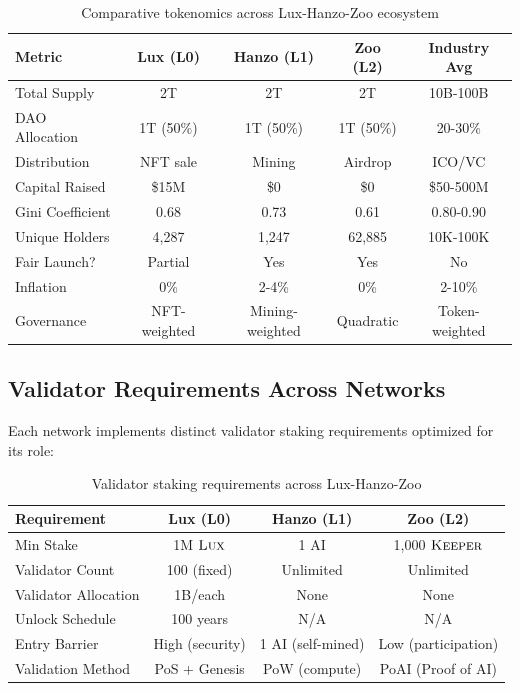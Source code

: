 \begin{table}[h]
\centering
\small
\begin{tabular}{lcccc}
\toprule
\textbf{Metric} & \textbf{Lux (L0)} & \textbf{Hanzo (L1)} & \textbf{Zoo (L2)} & \textbf{Industry Avg} \\
\midrule
Total Supply & 2T & 2T & 2T & 10B-100B \\
DAO Allocation & 1T (50\%) & 1T (50\%) & 1T (50\%) & 20-30\% \\
Distribution & NFT sale & Mining & Airdrop & ICO/VC \\
Capital Raised & \$15M & \$0 & \$0 & \$50-500M \\
Gini Coefficient & 0.68 & 0.73 & 0.61 & 0.80-0.90 \\
Unique Holders & 4,287 & 1,247 & 62,885 & 10K-100K \\
Fair Launch? & Partial & Yes & Yes & No \\
Inflation & 0\% & 2-4\% & 0\% & 2-10\% \\
Governance & NFT-weighted & Mining-weighted & Quadratic & Token-weighted \\
\bottomrule
\end{tabular}
\caption{Comparative tokenomics across Lux-Hanzo-Zoo ecosystem}
\label{tab:cross_network}
\end{table}

\subsection{Validator Requirements Across Networks}

Each network implements distinct validator staking requirements optimized for its role:

\begin{table}[h]
\centering
\begin{tabular}{lccc}
\toprule
\textbf{Requirement} & \textbf{Lux (L0)} & \textbf{Hanzo (L1)} & \textbf{Zoo (L2)} \\
\midrule
Min Stake & 1M $\textsc{Lux}$ & 1 AI & 1,000 $\textsc{Keeper}$ \\
Validator Count & 100 (fixed) & Unlimited & Unlimited \\
Validator Allocation & 1B/each & None & None \\
Unlock Schedule & 100 years & N/A & N/A \\
Entry Barrier & High (security) & 1 AI (self-mined) & Low (participation) \\
Validation Method & PoS + Genesis & PoW (compute) & PoAI (Proof of AI) \\
\bottomrule
\end{tabular}
\caption{Validator staking requirements across Lux-Hanzo-Zoo}
\label{tab:validator_comparison}
\end{table}

